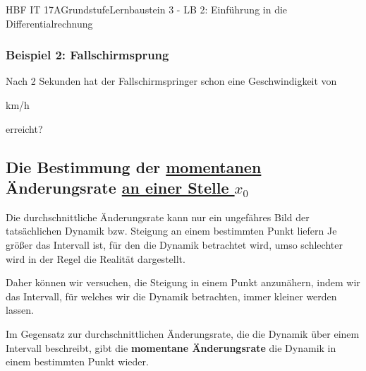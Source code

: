\documentclass[11pt,twocolumn,oneside,openany,headings=optiontotoc,11pt,numbers=noenddot]{article}
\begin{document}
\begin{worksheet}{HBF IT 17A}{Grundstufe}{Lernbaustein 3 - LB 2: Einführung in die Differentialrechnung}
		\subsubsection*{Beispiel 2: Fallschirmsprung}
		Nach 2 Sekunden hat der Fallschirmspringer schon eine Geschwindigkeit von\\
		\begin{center}
			 km/h
		\end{center}
		erreicht?\\
		\par\noindent
		
		\subsection{Die Bestimmung der \underline{momentanen} Änderungsrate \underline{an einer Stelle \(x_{0}\)}}
		Die durchschnittliche Änderungsrate kann nur ein ungefähres Bild der tatsächlichen Dynamik bzw. Steigung an einem bestimmten Punkt liefern Je größer das Intervall ist, für den die Dynamik betrachtet wird, umso schlechter wird in der Regel die Realität dargestellt.\\
		\par\noindent
		Daher können wir versuchen, die Steigung in einem Punkt anzunähern, indem wir das Intervall, für welches wir die Dynamik betrachten, immer kleiner werden lassen.\\
		\par\noindent
		Im Gegensatz zur durchschnittlichen Änderungsrate, die die Dynamik über einem Intervall beschreibt, gibt die \textbf{momentane Änderungsrate} die Dynamik in einem bestimmten Punkt wieder.

\end{worksheet}
\end{document}
